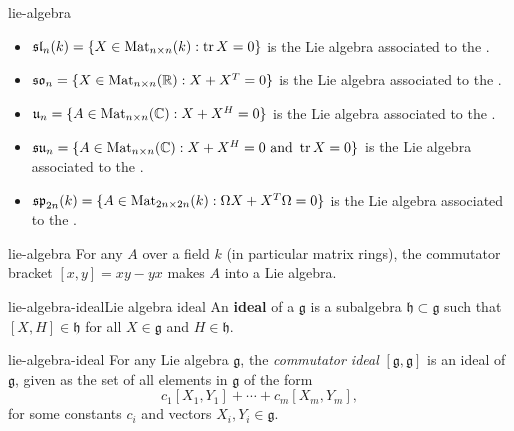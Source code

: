 \begin{example}{lie-algebra}
    \begin{itemize}
        \item $\mathfrak{sl}_n(k) = \{ X \in \textup{Mat}_{n \times n}(k) : \operatorname{tr} X = 0 \}$ is the Lie algebra associated to the .
        \item $\mathfrak{so}_n = \{ X \in \textup{Mat}_{n \times n}(\mathbb{R}) : X + X^T = 0 \}$ is the Lie algebra associated to the .
        \item $\mathfrak{u}_n = \{ A \in \textup{Mat}_{n \times n}(\mathbb{C}) : X + X^H = 0 \}$ is the Lie algebra associated to the .
        \item $\mathfrak{su}_n = \{ A \in \textup{Mat}_{n \times n}(\mathbb{C}) : X + X^H = 0 \textup{ and } \operatorname{tr} X = 0 \}$ is the Lie algebra associated to the .
        \item $\mathfrak{sp}_{2n}(k) = \{ A \in \textup{Mat}_{2n \times 2n}(k) : \Omega X + X^T \Omega = 0 \}$ is the Lie algebra associated to the .
    \end{itemize}
\end{example}

\begin{example}{lie-algebra}
    For any  $A$ over a field $k$ (in particular matrix rings), the commutator bracket $[x, y] = xy - yx$ makes $A$ into a Lie algebra.
\end{example}

\begin{topic}{lie-algebra-ideal}{Lie algebra ideal}
    An \textbf{ideal} of a  $\mathfrak{g}$ is a subalgebra $\mathfrak{h} \subset \mathfrak{g}$ such that $[X, H] \in \mathfrak{h}$ for all $X \in \mathfrak{g}$ and $H \in \mathfrak{h}$.
\end{topic}

\begin{example}{lie-algebra-ideal}
    For any Lie algebra $\mathfrak{g}$, the \textit{commutator ideal} $[\mathfrak{g}, \mathfrak{g}]$ is an ideal of $\mathfrak{g}$, given as the set of all elements in $\mathfrak{g}$ of the form
    \[ c_1 [X_1, Y_1] + \cdots + c_m [X_m, Y_m] , \]
    for some constants $c_i$ and vectors $X_i, Y_i \in \mathfrak{g}$.
\end{example}

